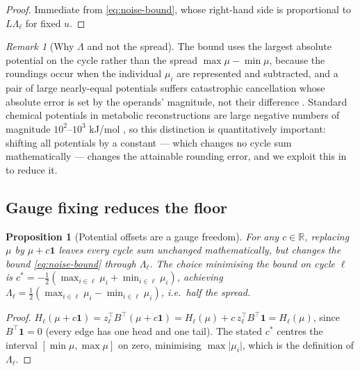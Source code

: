 \documentclass[11pt,twocolumn,a4paper]{article}
\theoremstyle{pstyle}
\newtheorem{proposition}[theorem]{Proposition}
\theoremstyle{definition}
\theoremstyle{remark}
\newtheorem{remark}[theorem]{Remark}
\newcommand{\R}{\mathbb{R}}
\newcommand{\abs}[1]{\lvert#1\rvert}
\newcommand{\hol}{H}
\newcommand{\mach}{u}
\begin{document}
\begin{proof}
Immediate from \eqref{eq:noise-bound}, whose right-hand side is
proportional to $L\Lambda_\ell$ for fixed $\mach$.
\end{proof}

\begin{remark}[Why $\Lambda$ and not the spread]
\label{rem:lambda}
The bound uses the largest absolute potential on the cycle rather than
the spread $\max\mu-\min\mu$, because the roundings occur when the
individual $\mu_i$ are represented and subtracted, and a pair of large
nearly-equal potentials suffers catastrophic cancellation whose absolute
error is set by the operands' magnitude, not their difference
\citep{goldberg1991,higham2002}. Standard chemical potentials in
metabolic reconstructions are large negative numbers of magnitude
$10^{2}$--$10^{3}$ kJ/mol \citep{alberty1998,noor2013}, so this
distinction is quantitatively important: shifting all potentials by a
constant --- which changes no cycle sum mathematically --- changes the
attainable rounding error, and we exploit this in
 to reduce it.
\end{remark}

\subsection{Gauge fixing reduces the floor}
\label{sec:gauge}

\begin{proposition}[Potential offsets are a gauge freedom]
\label{prop:gauge}
For any $c\in\R$, replacing $\mu$ by $\mu + c\mathbf{1}$ leaves every
cycle sum unchanged mathematically, but changes the bound
\eqref{eq:noise-bound} through $\Lambda_\ell$. The choice minimising the
bound on cycle $\ell$ is
$c^{\ast} = -\tfrac{1}{2}(\max_{i\in\ell}\mu_i + \min_{i\in\ell}\mu_i)$,
achieving $\Lambda_\ell = \tfrac{1}{2}(\max_{i\in\ell}\mu_i -
\min_{i\in\ell}\mu_i)$, i.e.\ half the spread.
\end{proposition}

\begin{proof}
$\hol_\ell(\mu+c\mathbf{1}) = z_\ell^{\top}B^{\top}(\mu+c\mathbf{1})
= \hol_\ell(\mu) + c\,z_\ell^{\top}B^{\top}\mathbf{1} = \hol_\ell(\mu)$,
since $B^{\top}\mathbf{1}=0$ (every edge has one head and one tail).
The stated $c^{\ast}$ centres the interval $[\min\mu,\max\mu]$ on zero,
minimising $\max\abs{\mu_i}$, which is the definition of $\Lambda_\ell$.
\end{proof}
\end{document}
